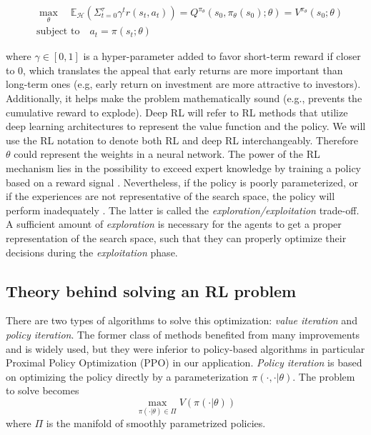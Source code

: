 \documentclass[a4paper]{article}
\begin{document}
\begin{align*}
    & \text{$\max_{\theta}$} \quad \mathbb{E}_{\mathcal{H}}(\Sigma_{t = 0}^{\tau} \gamma^t r(s_t,a_t)) =   Q^{\pi_{\theta}}(s_0,\pi_{\theta}(s_0);\theta) = V^{\pi_{\theta}}(s_0;\theta)\\
    & \text{subject to} \quad a_t = \pi(s_t;\theta)
\end{align*}

where $\gamma \in [0,1]$ is a hyper-parameter added to favor short-term reward if closer to 0, which translates the appeal that early returns are more important than long-term ones (e.g, early return on investment are more attractive to investors). Additionally, it helps make the problem mathematically sound (e.g., prevents the cumulative reward to explode). Deep RL will refer to RL methods that utilize deep learning architectures to represent the value function and the policy. We will use the RL notation to denote both RL and deep RL interchangeably. Therefore $\theta$ could represent the weights in a neural network. The power of the RL mechanism lies in the possibility to exceed expert knowledge by training a policy based on a reward signal \cite{bengio2018machine}. Nevertheless, if the policy is poorly parameterized, or if the experiences are 
not representative of the search space, the policy will perform inadequately \cite{bengio2018machine}. The latter is called the \textit{exploration/exploitation} trade-off. A sufficient amount of \textit{exploration} is necessary for the agents to get a proper representation of the search space, such that they can properly optimize their decisions during the \textit{exploitation} phase. 
\subsection{Theory behind solving an RL problem}
\label{sec:solvingrlproblem}
There are two types of algorithms to solve this optimization: \textit{value iteration} and \textit{policy iteration}. The former class of methods benefited from many improvements \cite{hessel2018raindbow} and is widely used, but they were inferior to policy-based algorithms in particular Proximal Policy Optimization (PPO) \cite{schulman2017proximal} in our application. \textit{Policy iteration} is based on optimizing the policy directly by a parameterization $\pi(\cdot,\cdot |\theta)$. The problem to solve becomes 
\[\max_{\pi(\cdot | \theta) \in \Pi} V(\pi(\cdot|\theta))\]
where $\Pi$ is the manifold of smoothly parametrized policies.
\end{document}
